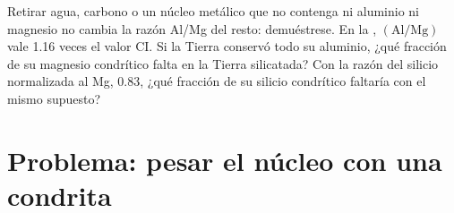 \begin{exercise}[$\star\star\star$]\label{exo:b2:elements-in-the-earth:12}
Retirar agua, carbono o un núcleo metálico que no contenga ni aluminio ni
magnesio no cambia la razón Al/Mg del resto: demuéstrese. En la , $(\mathrm{Al}/\mathrm{Mg})$ vale 1.16 veces el valor CI. Si la
Tierra conservó todo su aluminio, ¿qué fracción de su magnesio condrítico
falta en la Tierra silicatada? Con la razón del silicio normalizada al Mg,
0.83, ¿qué fracción de su silicio condrítico faltaría con el mismo
supuesto?
\end{exercise}

\section{Problema: pesar el núcleo con una condrita}


